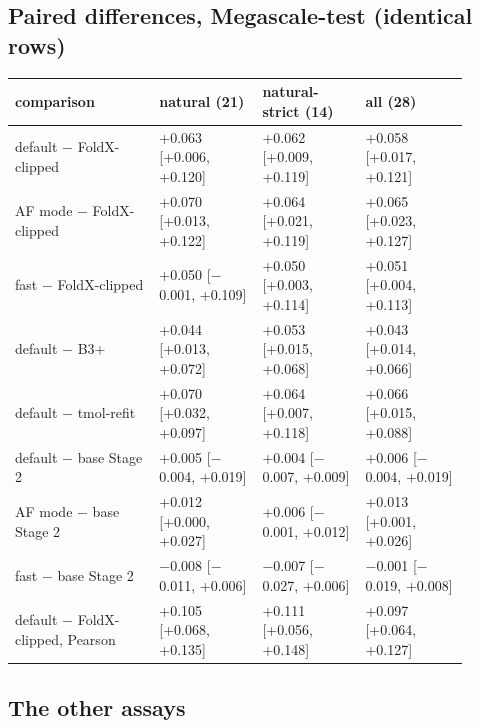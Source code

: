 \documentclass[11pt,a4paper]{article}
\begin{document}
\subsection*{Paired differences, Megascale-test (identical rows)}

\begin{center}\scriptsize
\begin{tabular}{@{}>{\raggedright\arraybackslash}p{0.285\linewidth}>{\raggedright\arraybackslash}p{0.205\linewidth}>{\raggedright\arraybackslash}p{0.205\linewidth}>{\raggedright\arraybackslash}p{0.205\linewidth}@{}}
\toprule
comparison & natural (21) & natural-strict (14) & all (28) \\
\midrule
default $-$ FoldX-clipped & +0.063 [+0.006, +0.120] & +0.062 [+0.009, +0.119] & +0.058 [+0.017, +0.121] \\
AF mode $-$ FoldX-clipped & +0.070 [+0.013, +0.122] & +0.064 [+0.021, +0.119] & +0.065 [+0.023, +0.127] \\
fast $-$ FoldX-clipped & +0.050 [$-$0.001, +0.109] & +0.050 [+0.003, +0.114] & +0.051 [+0.004, +0.113] \\
default $-$ B3+ & +0.044 [+0.013, +0.072] & +0.053 [+0.015, +0.068] & +0.043 [+0.014, +0.066] \\
default $-$ tmol-refit & +0.070 [+0.032, +0.097] & +0.064 [+0.007, +0.118] & +0.066 [+0.015, +0.088] \\
default $-$ base Stage 2 & +0.005 [$-$0.004, +0.019] & +0.004 [$-$0.007, +0.009] & +0.006 [$-$0.004, +0.019] \\
AF mode $-$ base Stage 2 & +0.012 [+0.000, +0.027] & +0.006 [$-$0.001, +0.012] & +0.013 [+0.001, +0.026] \\
fast $-$ base Stage 2 & $-$0.008 [$-$0.011, +0.006] & $-$0.007 [$-$0.027, +0.006] & $-$0.001 [$-$0.019, +0.008] \\
default $-$ FoldX-clipped, Pearson & +0.105 [+0.068, +0.135] & +0.111 [+0.056, +0.148] & +0.097 [+0.064, +0.127] \\
\bottomrule
\end{tabular}\end{center}

\subsection*{The other assays}
\end{document}
